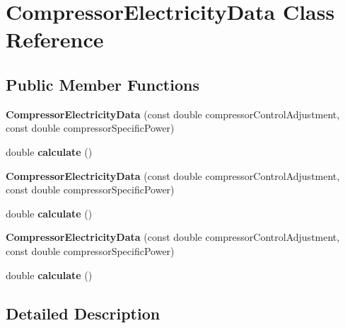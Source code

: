 \hypertarget{class_compressor_electricity_data}{}\section{Compressor\+Electricity\+Data Class Reference}
\label{class_compressor_electricity_data}
\subsection*{Public Member Functions}
\begin{DoxyCompactItemize}
\item 
\mbox{\label{class_compressor_electricity_data_ae05eeb792feaaaccff5246295144dd3f}} 
{\bfseries Compressor\+Electricity\+Data} (const double compressor\+Control\+Adjustment, const double compressor\+Specific\+Power)
\item 
\mbox{\label{class_compressor_electricity_data_af9c33455904a89d847056f940f262d43}} 
double {\bfseries calculate} ()
\item 
\mbox{\label{class_compressor_electricity_data_ae05eeb792feaaaccff5246295144dd3f}} 
{\bfseries Compressor\+Electricity\+Data} (const double compressor\+Control\+Adjustment, const double compressor\+Specific\+Power)
\item 
\mbox{\label{class_compressor_electricity_data_af9c33455904a89d847056f940f262d43}} 
double {\bfseries calculate} ()
\item 
\mbox{\label{class_compressor_electricity_data_ae05eeb792feaaaccff5246295144dd3f}} 
{\bfseries Compressor\+Electricity\+Data} (const double compressor\+Control\+Adjustment, const double compressor\+Specific\+Power)
\item 
\mbox{\label{class_compressor_electricity_data_af9c33455904a89d847056f940f262d43}} 
double {\bfseries calculate} ()
\end{DoxyCompactItemize}


\subsection{Detailed Description}


